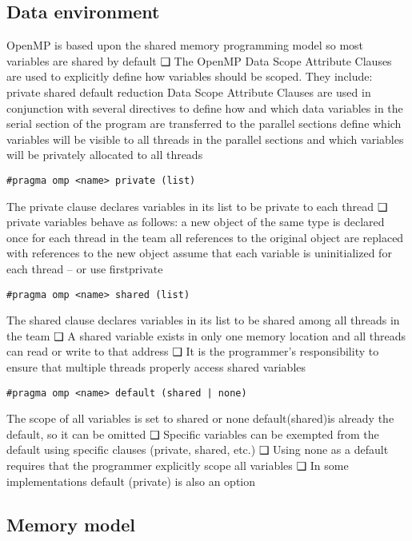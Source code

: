 \subsection{Data environment}
OpenMP is based upon the shared memory
programming model so most variables are shared
by default
❑ The OpenMP Data Scope Attribute Clauses are
used to explicitly define how variables should be
scoped. They include:
private
shared
default
reduction
Data Scope Attribute Clauses are used in
conjunction with several directives to
define how and which data variables in the
serial section of the program are transferred to
the parallel sections
define which variables will be visible to all
threads in the parallel sections and which
variables will be privately allocated to all
threads
\begin{lstlisting}[style=C]
#pragma omp <name> private (list)
\end{lstlisting}
The private clause declares variables in its list to
be private to each thread
❑ private variables behave as follows:
a new object of the same type is declared once
for each thread in the team
all references to the original object are replaced
with references to the new object
assume that each variable is uninitialized for
each thread – or use firstprivate



\begin{lstlisting}[style=C]
#pragma omp <name> shared (list)
\end{lstlisting}
The shared clause declares variables in its list to
be shared among all threads in the team
❑ A shared variable exists in only one memory
location and all threads can read or write to that
address
❑ It is the programmer's responsibility to ensure that
multiple threads properly access shared variables



\begin{lstlisting}[style=C]
#pragma omp <name> default (shared | none)
\end{lstlisting}
The scope of all variables is set to shared or none
default(shared)is already the default, so it
can be omitted
❑ Specific variables can be exempted from the
default using specific clauses (private, shared,
etc.)
❑ Using none as a default requires that the
programmer explicitly scope all variables
❑ In some implementations default (private) is
also an option


\subsection{Memory model}

